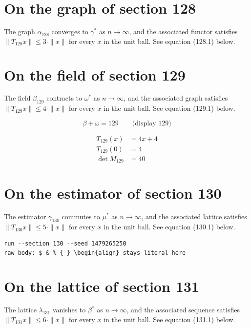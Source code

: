 \documentclass{article}
\begin{document}
\section{On the graph of section 128}
The graph $\alpha_{128}$ converges to $\gamma^{*}$ as $n \to \infty$,
and the associated functor satisfies $\|T_{128} x\| \leq 3 \cdot \|x\|$
for every $x$ in the unit ball. See equation (128.1) below.

\section{On the field of section 129}
The field $\beta_{129}$ contracts to $\omega^{*}$ as $n \to \infty$,
and the associated graph satisfies $\|T_{129} x\| \leq 4 \cdot \|x\|$
for every $x$ in the unit ball. See equation (129.1) below.

$$
\beta + \omega = 129 \qquad \text{(display 129)}
$$

\begin{align}
T_{129}(x) &= 4 x + 4 \\
T_{129}(0) &= 4 \\
\det M_{129} &= 40
\end{align}

\section{On the estimator of section 130}
The estimator $\gamma_{130}$ commutes to $\mu^{*}$ as $n \to \infty$,
and the associated lattice satisfies $\|T_{130} x\| \leq 5 \cdot \|x\|$
for every $x$ in the unit ball. See equation (130.1) below.

\begin{verbatim}
run --section 130 --seed 1479265250
raw body: $ & % { } \begin{align} stays literal here
\end{verbatim}

\section{On the lattice of section 131}
The lattice $\lambda_{131}$ vanishes to $\beta^{*}$ as $n \to \infty$,
and the associated sequence satisfies $\|T_{131} x\| \leq 6 \cdot \|x\|$
for every $x$ in the unit ball. See equation (131.1) below.
\end{document}
